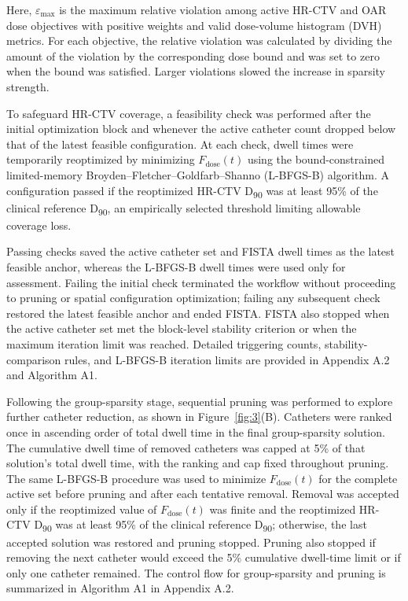 \documentclass[12pt,twoside,letterpaper]{article}
\newcounter{algorithm}
\begin{document}
Here, $\varepsilon_{\max}$ is the maximum relative violation among active HR-CTV and OAR dose objectives with positive weights and valid dose-volume histogram (DVH) metrics. For each objective, the relative violation was calculated by dividing the amount of the violation by the corresponding dose bound and was set to zero when the bound was satisfied. Larger violations slowed the increase in sparsity strength.

To safeguard HR-CTV coverage, a feasibility check was performed after the initial optimization block and whenever the active catheter count dropped below that of the latest feasible configuration. At each check, dwell times were temporarily reoptimized by minimizing $F_{\text{dose}}\left( t \right)$ using the bound-constrained limited-memory Broyden--Fletcher--Goldfarb--Shanno (L-BFGS-B) algorithm.\cite{ref76,ref77} A configuration passed if the reoptimized HR-CTV D\textsubscript{90} was at least 95\% of the clinical reference D\textsubscript{90}, an empirically selected threshold limiting allowable coverage loss.

Passing checks saved the active catheter set and FISTA dwell times as the latest feasible anchor, whereas the L-BFGS-B dwell times were used only for assessment. Failing the initial check terminated the workflow without proceeding to pruning or spatial configuration optimization; failing any subsequent check restored the latest feasible anchor and ended FISTA. FISTA also stopped when the active catheter set met the block-level stability criterion or when the maximum iteration limit was reached. Detailed triggering counts, stability-comparison rules, and L-BFGS-B iteration limits are provided in Appendix A.2 and Algorithm A1.

Following the group-sparsity stage, sequential pruning was performed to explore further catheter reduction, as shown in Figure~\ref{fig:3}(B). Catheters were ranked once in ascending order of total dwell time in the final group-sparsity solution. The cumulative dwell time of removed catheters was capped at 5\% of that solution's total dwell time, with the ranking and cap fixed throughout pruning. The same L-BFGS-B procedure was used to minimize $F_{\text{dose}}\left( t \right)$ for the complete active set before pruning and after each tentative removal. Removal was accepted only if the reoptimized value of $F_{\text{dose}}\left( t \right)$ was finite and the reoptimized HR-CTV D\textsubscript{90} was at least 95\% of the clinical reference D\textsubscript{90}; otherwise, the last accepted solution was restored and pruning stopped. Pruning also stopped if removing the next catheter would exceed the 5\% cumulative dwell-time limit or if only one catheter remained. The control flow for group-sparsity and pruning is summarized in Algorithm A1 in Appendix A.2.
\end{document}
